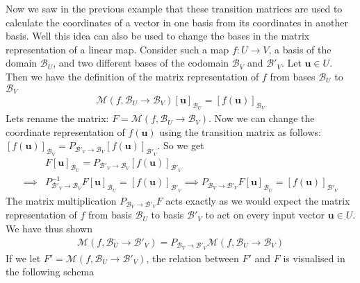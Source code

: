 Now we saw in the previous example that these transition matrices are used to calculate the coordinates of a vector in one basis from its coordinates in another basis. Well this idea can also be used to change the bases in the matrix representation of a linear map. Consider such a map $f:U \to V$, a basis of the domain $\mathcal{B}_U$, and two different bases of the codomain $\mathcal{B}_V$ and $\mathcal{B}'_V$. Let $\mathbf{u} \in U$. Then we have the definition of the matrix representation of $f$ from bases $\mathcal{B}_U$ to $\mathcal{B}_V$
\begin{align*}
\mathcal{M}(f,\mathcal{B}_U\to \mathcal{B}_V)[\mathbf{u}]_{\mathcal{B}_U} = [f(\mathbf{u})]_{\mathcal{B}_V}
\end{align*}
Lets rename the matrix: $F=\mathcal{M}(f,\mathcal{B}_U\to \mathcal{B}_V)$. Now we can change the coordinate representation of $f(\mathbf{u})$ using the transition matrix as follows: $[f(\mathbf{u})]_{\mathcal{B}_V} = P_{\mathcal{B}'_V\to\mathcal{B}_V}[f(\mathbf{u})]_{\mathcal{B}'_V}$. So we get
\begin{align*}
& F [\mathbf{u}]_{\mathcal{B}_U} = P_{\mathcal{B}'_V\to\mathcal{B}_V}[f(\mathbf{u})]_{\mathcal{B}'_V} \\
\implies & P^{-1}_{\mathcal{B}'_V\to\mathcal{B}_V} F[\mathbf{u}]_{\mathcal{B}_U} = [f(\mathbf{u})]_{\mathcal{B}'_V} \implies P_{\mathcal{B}_V \to \mathcal{B}'_V} F[\mathbf{u}]_{\mathcal{B}_U} = [f(\mathbf{u})]_{\mathcal{B}'_V}
\end{align*}
The matrix multiplication $P_{\mathcal{B}_V \to \mathcal{B}'_V} F$ acts exactly as we would expect the matrix representation of $f$ from basis $\mathcal{B}_U$ to basis $\mathcal{B}'_V$ to act on every input vector $\mathbf{u} \in U$. We have thus shown
\begin{align*}
\mathcal{M}(f,\mathcal{B}_U\to \mathcal{B}'_V)  = P_{\mathcal{B}_V \to \mathcal{B}'_V} \mathcal{M}(f,\mathcal{B}_U\to \mathcal{B}_V)
\end{align*}
If we let $F' = \mathcal{M}(f,\mathcal{B}_U\to \mathcal{B}'_V)$, the relation between $F'$ and $F$ is visualised in the following schema
